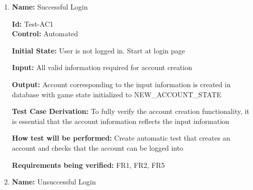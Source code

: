 \documentclass[12pt, titlepage]{article}
\begin{document}

\begin{enumerate}


					
					
					

					


\item{\textbf{Name:} Successful Login } %

\textbf{Id:} Test-AC1 \label{Test-AC1} \\

\textbf{Control:} Automated
					
\textbf{Initial State:} User is not logged in. Start at login page
					
\textbf{Input:} All valid information required for account creation
					
\textbf{Output:} Account corresponding to the input information is created in database with game state initialized to NEW\_ACCOUNT\_STATE

\textbf{Test Case Derivation:} To fully verify the account creation functionality, it is essential that the account information reflects the input information

\textbf{How test will be performed:} Create automatic test that creates an account and checks that the account can be logged into

\textbf{Requirements being verified:} FR1, FR2, FR5

\item{\textbf{Name:} Unsuccessful Login }%


\end{enumerate}
\end{document}

